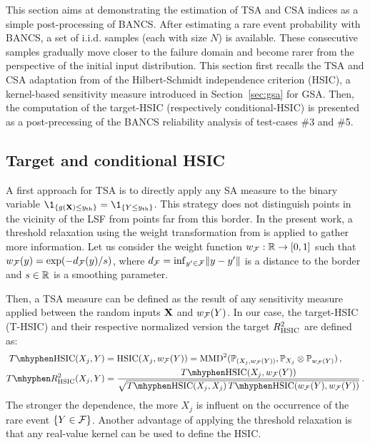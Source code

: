 This section aims at demonstrating the estimation of TSA and CSA indices as a simple post-processing of BANCS. 
After estimating a rare event probability with BANCS, a set of i.i.d. samples (each with size $N$) is available. 
These consecutive samples gradually move closer to the failure domain and become rarer from the perspective of the initial input distribution. 
This section first recalls the TSA and CSA adaptation from \citet{marrel_chabridon_2021} of the Hilbert-Schmidt independence criterion (HSIC), a kernel-based sensitivity measure introduced in Section~\ref{sec:gsa} for GSA.
Then, the computation of the target-HSIC (respectively conditional-HSIC) is presented as a post-precessing of the BANCS reliability analysis of test-cases \#3 and \#5. 


\subsection{Target and conditional HSIC}

A first approach for TSA is to directly apply any SA measure to the binary variable $\1_{\{g(\bX) \leq \yth\}} = \1_{\{Y \leq \yth\}}$. 
This strategy does not distinguish points in the vicinity of the LSF from points far from this border. 
In the present work, a threshold relaxation using the weight transformation from \citet{marrel_chabridon_2021} is applied to gather more information. 
Let us consider the weight function $w_{\mathcal{F}}: \mathbb{R} \rightarrow [0, 1]$ such that $w_{\mathcal{F}}(y) = \exp(-d_{\mathcal{F}}(y)/s)$, where $d_{\mathcal{F}} = \mathrm{inf}_{y'\in \mathcal{F}} \Vert y -y' \Vert$ is a distance to the border and $s\in\mathbb{R}$ is a smoothing parameter. 

Then, a TSA measure can be defined as the result of any sensitivity measure applied between the random inputs ${\bf X}$ and $w_{\mathcal{F}}(Y)$. 
In our case, the target-HSIC (T-HSIC) and their respective normalized version the target $R^2_{\mathrm{HSIC}}$ are defined as: 
\begin{subequations}
    \begin{align}
        T \mhyphen \HSIC(X_j, Y) & = \HSIC(X_j, w_{\iF}(Y)) = \MMD^2(\P_{(X_j, w_{\iF}(Y))}, \P_{X_j} \otimes \P_{w_{\iF}(Y)})\, ,\\
        T \mhyphen R^2_{\HSIC}(X_j, Y) &= \frac{T \mhyphen \HSIC(X_j, w_{\iF}(Y))}{\sqrt{T \mhyphen \HSIC(X_j, X_j) \, T \mhyphen \HSIC(w_{\iF}(Y), w_{\iF}(Y))}}\, .
    \end{align}
\end{subequations}
The stronger the dependence, the more $X_j$ is influent on the occurrence of the rare event $\{Y\in\mathcal{F}\}$.  
Another advantage of applying the threshold relaxation is that any real-value kernel can be used to define the HSIC. 


